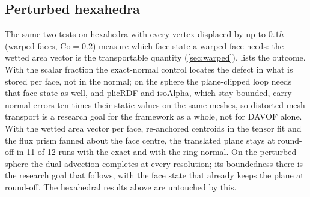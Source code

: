 \documentclass[preprint,12pt]{elsarticle}
\begin{document}
\subsection{Perturbed hexahedra}
\label{sec:tpf-perturbed}

The same two tests on hexahedra with every vertex displaced by up to $0.1h$ (warped faces, $\mathrm{Co} = 0.2$) measure which face state a warped face needs: the wetted area vector is the transportable quantity (\cref{sec:warped}).  lists the outcome. With the scalar fraction the exact-normal control locates the defect in what is stored per face, not in the normal; on the sphere the plane-clipped loop needs that face state as well, and plicRDF and isoAlpha, which stay bounded, carry normal errors ten times their static values on the same meshes, so distorted-mesh transport is a research goal for the framework as a whole, not for DAVOF alone. With the wetted area vector per face, re-anchored centroids in the tensor fit and the flux prism fanned about the face centre, the translated plane stays at round-off in 11 of 12 runs with the exact and with the ring normal. On the perturbed sphere the dual advection completes at every resolution; its boundedness there is the research goal that follows, with the face state that already keeps the plane at round-off. The hexahedral results above are untouched by this.
\end{document}
